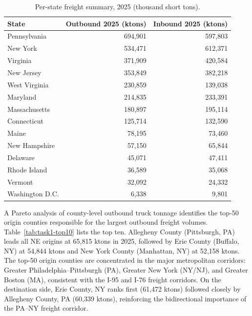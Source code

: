 \begin{table}[H]
\centering
\caption{Per-state freight summary, 2025 (thousand short tons).}
\begin{tabular}{lrr}
\toprule
State & Outbound 2025 (ktons) & Inbound 2025 (ktons) \\
\midrule
Pennsylvania      & 694{,}901 & 597{,}803 \\
New York          & 534{,}471 & 612{,}371 \\
Virginia          & 371{,}909 & 420{,}584 \\
New Jersey        & 353{,}849 & 382{,}218 \\
West Virginia     & 230{,}859 & 139{,}038 \\
Maryland          & 214{,}835 & 233{,}391 \\
Massachusetts     & 180{,}897 & 195{,}114 \\
Connecticut       & 125{,}714 & 132{,}590 \\
Maine             &  78{,}195 &  73{,}460 \\
New Hampshire     &  57{,}150 &  65{,}844 \\
Delaware          &  45{,}071 &  47{,}411 \\
Rhode Island      &  36{,}589 &  35{,}068 \\
Vermont           &  32{,}092 &  24{,}332 \\
Washington D.C.   &   6{,}338 &   9{,}801 \\
\bottomrule
\end{tabular}
\label{tab:task1-state}
\end{table}

A Pareto analysis of county-level outbound truck tonnage identifies the top-50 origin
counties responsible for the largest outbound freight volumes. Table~\ref{tab:task1-top10}
lists the top ten. Allegheny County (Pittsburgh, PA) leads all NE origins at
65{,}815 ktons in 2025, followed by Erie County (Buffalo, NY) at 54{,}844 ktons and
New York County (Manhattan, NY) at 52{,}158 ktons. The top-50 origin counties are
concentrated in the major metropolitan corridors: Greater Philadelphia--Pittsburgh
(PA), Greater New York (NY/NJ), and Greater Boston (MA), consistent with the I-95
and I-76 freight corridors. On the destination side, Erie County, NY ranks first
(61{,}472 ktons) followed closely by Allegheny County, PA (60{,}339 ktons), reinforcing
the bidirectional importance of the PA--NY freight corridor.

